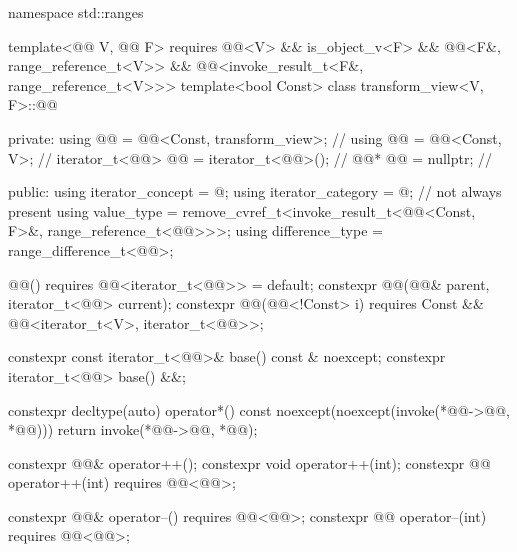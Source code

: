 \begin{codeblock}
namespace std::ranges {
  template<@@ V, @@ F>
    requires @@<V> && is_object_v<F> &&
             @@<F&, range_reference_t<V>> &&
             @@<invoke_result_t<F&, range_reference_t<V>>>
  template<bool Const>
  class transform_view<V, F>::@@ {
  private:
    using @@ = @@<Const, transform_view>;          // \expos
    using @@ = @@<Const, V>;                         // \expos
    iterator_t<@@> @@ = iterator_t<@@>();             // \expos
    @@* @@ = nullptr;                                  // \expos

  public:
    using iterator_concept  = @\seebelownc@;
    using iterator_category = @\seebelownc@;                        // not always present
    using value_type        =
      remove_cvref_t<invoke_result_t<@@<Const, F>&, range_reference_t<@@>>>;
    using difference_type   = range_difference_t<@@>;

    @@() requires @@<iterator_t<@@>> = default;
    constexpr @@(@@& parent, iterator_t<@@> current);
    constexpr @@(@@<!Const> i)
      requires Const && @@<iterator_t<V>, iterator_t<@@>>;

    constexpr const iterator_t<@@>& base() const & noexcept;
    constexpr iterator_t<@@> base() &&;

    constexpr decltype(auto) operator*() const
      noexcept(noexcept(invoke(*@@->@@, *@@))) {
      return invoke(*@@->@@, *@@);
    }

    constexpr @@& operator++();
    constexpr void operator++(int);
    constexpr @@ operator++(int) requires @@<@@>;

    constexpr @@& operator--() requires @@<@@>;
    constexpr @@ operator--(int) requires @@<@@>;

}}
\end{codeblock}
